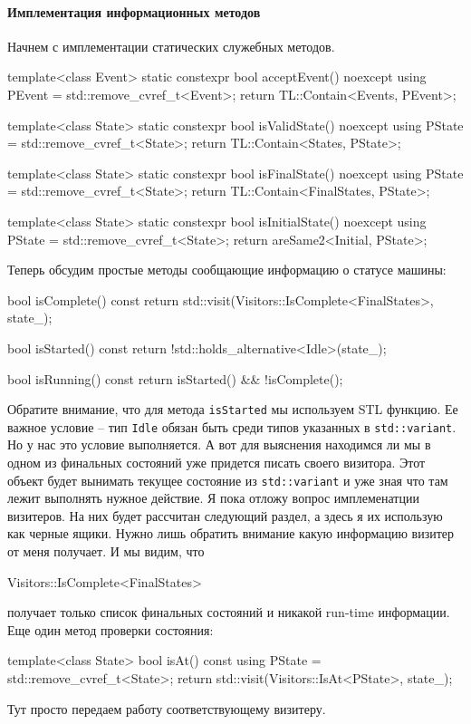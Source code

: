 \documentclass{article}
\begin{document}
{\paragraph{Имплементация информационных методов}

Начнем с имплементации статических служебных методов.
\begin{cppcode}
template<class Event>
static constexpr bool acceptEvent() noexcept {
  using PEvent = std::remove_cvref_t<Event>;
  return TL::Contain<Events, PEvent>;
}

template<class State>
static constexpr bool isValidState() noexcept {
  using PState = std::remove_cvref_t<State>;
  return TL::Contain<States, PState>;
}

template<class State>
static constexpr bool isFinalState() noexcept {
  using PState = std::remove_cvref_t<State>;
  return TL::Contain<FinalStates, PState>;
}

template<class State>
static constexpr bool isInitialState() noexcept {
  using PState = std::remove_cvref_t<State>;
  return areSame2<Initial, PState>;
}
\end{cppcode}
Теперь обсудим простые методы сообщающие информацию о статусе машины:
\begin{cppcode}
bool isComplete() const {
  return std::visit(Visitors::IsComplete<FinalStates>{}, state_);
}

bool isStarted() const {
  return !std::holds_alternative<Idle>(state_);
}

bool isRunning() const {
  return isStarted() && !isComplete();
}
\end{cppcode}
Обратите внимание, что для метода \verb"isStarted" мы используем STL функцию.
Ее важное условие -- тип \verb"Idle" обязан быть среди типов указанных в \verb"std::variant".
Но у нас это условие выполняется.
А вот для выяснения находимся ли мы в одном из финальных состояний уже придется писать своего визитора.
Этот объект будет вынимать текущее состояние из \verb"std::variant" и уже зная что там лежит выполнять нужное действие.
Я пока отложу вопрос имплеменатции визитеров.
На них будет рассчитан следующий раздел, а здесь я их использую как черные ящики.
Нужно лишь обратить внимание какую информацию визитер от меня получает.
И мы видим, что
\begin{cppcode}
Visitors::IsComplete<FinalStates>{}
\end{cppcode}
получает только список финальных состояний и никакой run-time информации.
Еще один метод проверки состояния:
\begin{cppcode}
template<class State>
bool isAt() const {
  using PState = std::remove_cvref_t<State>;
  return std::visit(Visitors::IsAt<PState>{}, state_);
}
\end{cppcode}
Тут просто передаем работу соответствующему визитеру.

}
\end{document}
